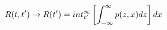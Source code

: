 \begin{equation}
R(t,t') \to R(t') = \\int_{t'}^\infty \left[ \int_{-\infty}^\infty p(z,x) dz \right] dx
\end{equation}